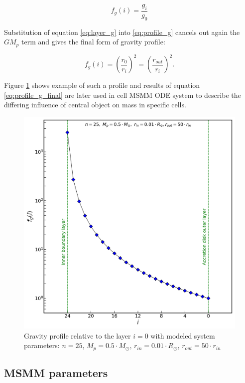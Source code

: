 \begin{equation} \label{eq:profile_g}
f_g(i) = \frac{g_i}{g_0}
\end{equation}

Substitution of equation \ref{eq:layer_g} into \ref{eq:profile_g} cancels out again the $GM_p$ term and gives the final form of gravity profile:

\begin{equation} \label{eq:profile_g_final}
f_g(i) = \left(\frac{r_{0}}{r_i}\right)^2=\left(\frac{r_{out}}{r_i}\right)^2.
\end{equation}

Figure \ref{fig:profile_g} shows example of such a profile and results of equation \ref{eq:profile_g_final} are later used in cell MSMM ODE system to describe the differing influence of central object on mass in specific cells. 

\begin{figure}[H]
\centering
\includegraphics[width=0.9\columnwidth]{img/profile_g.png}
\caption{Gravity profile relative to the layer $i = 0$ with modeled system parameters: $n=25$, $M_p = 0.5 \cdot M_{\odot}$, $r_{in} = 0.01 \cdot R_{\odot}$, $r_{out} = 50 \cdot r_{in}$}
\label{fig:profile_g}
\end{figure}

\subsection{MSMM parameters}



